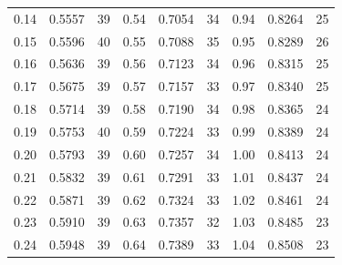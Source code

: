 \documentclass[russian, 12pt, fleqn]{article}
\begin{document}
\begin{tabular}[b]{ | l | l |  l || l | l | l || l | l | l |   }
0.14&0.5557&39&0.54&0.7054&34&0.94&0.8264&25\\%
0.15&0.5596&40&0.55&0.7088&35&0.95&0.8289&26\\%
0.16&0.5636&39&0.56&0.7123&34&0.96&0.8315&25\\%
0.17&0.5675&39&0.57&0.7157&33&0.97&0.8340&25\\%
0.18&0.5714&39&0.58&0.7190&34&0.98&0.8365&24\\%
0.19&0.5753&40&0.59&0.7224&33&0.99&0.8389&24\\%
0.20&0.5793&39&0.60&0.7257&34&1.00&0.8413&24\\%
0.21&0.5832&39&0.61&0.7291&33&1.01&0.8437&24\\%
0.22&0.5871&39&0.62&0.7324&33&1.02&0.8461&24\\%
0.23&0.5910&39&0.63&0.7357&32&1.03&0.8485&23\\%
0.24&0.5948&39&0.64&0.7389&33&1.04&0.8508&23\\%
\hline
\end{tabular}
\newpage
\noindent 
\end{document}

